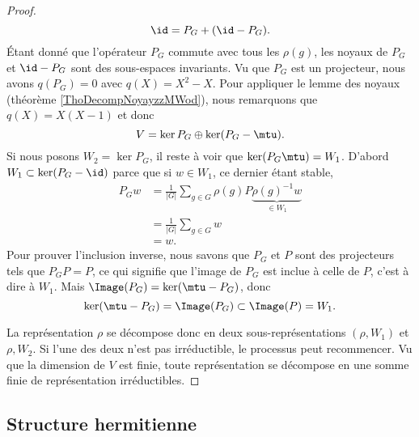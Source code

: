 \begin{proof}
    \begin{equation}
        \id=P_G+(\id-P_G).
    \end{equation}
    Étant donné que l'opérateur \( P_G\) commute avec tous les \( \rho(g)\), les noyaux de \( P_G\) et \( \id-P_G\) sont des sous-espaces invariants. Vu que \( P_G\) est un projecteur, nous avons \( q(P_G)=0\) avec \( q(X)=X^2-X\). Pour appliquer le lemme des noyaux (théorème \ref{ThoDecompNoyayzzMWod}), nous remarquons que \( q(X)=X(X-1)\) et donc 
    \begin{equation}
        V=\ker P_G\oplus\ker(P_G-\mtu).
    \end{equation}
    Si nous posons \( W_2=\ker P_G\), il reste à voir que \( \ker(P_G\mtu)=W_1\). D'abord \( W_1\subset\ker(P_G-\id)\) parce que si \( w\in W_1\), ce dernier étant stable,
    \begin{subequations}
        \begin{align}
            P_Gw&=\frac{1}{ | G | }\sum_{g\in G}\rho(g)P\underbrace{\rho(g)^{-1}w}_{\in W_1}\\
            &=\frac{1}{ | G | }\sum_{g\in G}w\\
            &=w.
        \end{align}
    \end{subequations}
    Pour prouver l'inclusion inverse, nous savons que \( P_G\) et \( P\) sont des projecteurs tels que \( P_GP=P\), ce qui signifie que l'image de \( P_G\) est inclue à celle de \( P\), c'est à dire à \( W_1\). Mais \( \Image(P_G)=\ker(\mtu-P_G)\), donc
    \begin{equation}
        \ker(\mtu-P_G)=\Image(P_G)\subset\Image(P)=W_1.
    \end{equation}

    La représentation \( \rho\) se décompose donc en deux sous-représentations \( (\rho,W_1)\) et \( \rho,W_2\). Si l'une des deux n'est pas irréductible, le processus peut recommencer. Vu que la dimension de \( V\) est finie, toute représentation se décompose en une somme finie de représentation irréductibles.
\end{proof}

\subsection{Structure hermitienne}

